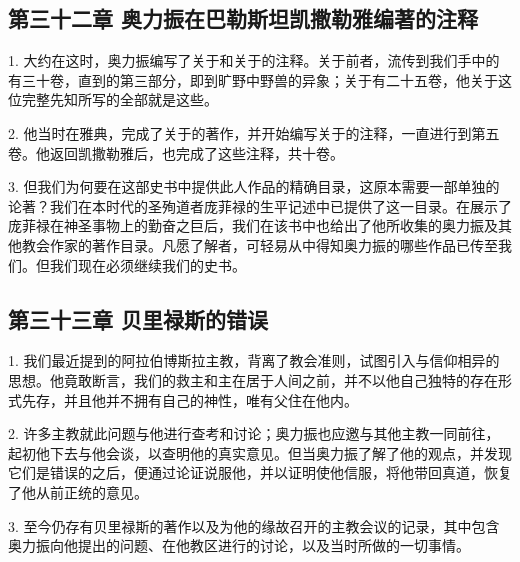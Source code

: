 
\subsection{第三十二章  奥力振在巴勒斯坦凯撒勒雅编著的注释}

1. 大约在这时，奥力振编写了关于和关于的注释。关于前者，流传到我们手中的有三十卷，直到的第三部分，即到旷野中野兽的异象；关于有二十五卷，他关于这位完整先知所写的全部就是这些。\par

2. 他当时在雅典，完成了关于的著作，并开始编写关于的注释，一直进行到第五卷。他返回凯撒勒雅后，也完成了这些注释，共十卷。\par

3. 但我们为何要在这部史书中提供此人作品的精确目录，这原本需要一部单独的论著？我们在本时代的圣殉道者庞菲禄的生平记述中已提供了这一目录。在展示了庞菲禄在神圣事物上的勤奋之巨后，我们在该书中也给出了他所收集的奥力振及其他教会作家的著作目录。凡愿了解者，可轻易从中得知奥力振的哪些作品已传至我们。但我们现在必须继续我们的史书。\par


\subsection{第三十三章 贝里禄斯的错误}

1. 我们最近提到的阿拉伯博斯拉主教，背离了教会准则，试图引入与信仰相异的思想。他竟敢断言，我们的救主和主在居于人间之前，并不以他自己独特的存在形式先存，并且他并不拥有自己的神性，唯有父住在他内。\par

2. 许多主教就此问题与他进行查考和讨论；奥力振也应邀与其他主教一同前往，起初他下去与他会谈，以查明他的真实意见。但当奥力振了解了他的观点，并发现它们是错误的之后，便通过论证说服他，并以证明使他信服，将他带回真道，恢复了他从前正统的意见。\par

3. 至今仍存有贝里禄斯的著作以及为他的缘故召开的主教会议的记录，其中包含奥力振向他提出的问题、在他教区进行的讨论，以及当时所做的一切事情。\par

